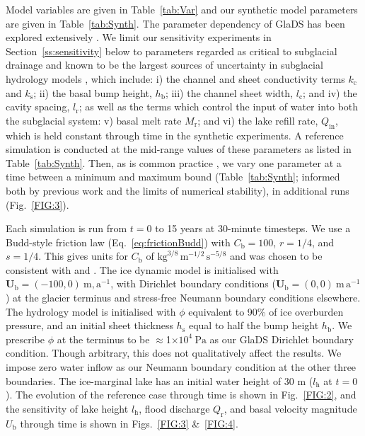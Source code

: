 \documentclass[tc, manuscript]{copernicus}
\begin{document}
Model variables are given in Table~\ref{tab:Var} and our synthetic model parameters are given in Table~\ref{tab:Synth}. The parameter dependency of GlaDS has been explored extensively \citep[e.g.,][]{dow2016modeling,dow2020totten,hill2024improved}. We limit our sensitivity experiments in Section~\ref{ss:sensitivity} below to parameters regarded as critical to subglacial drainage and known to be the largest sources of uncertainty in subglacial hydrology models \citep{werder2013modeling,hill2025computationally,hill2025emulator}, which include: i) the channel and sheet conductivity terms $k_{\mathrm{c}}$ and $k_{\mathrm{s}}$; ii) the basal bump height, $h_{\mathrm{b}}$; iii) the channel sheet width, $l_{\mathrm{c}}$; and iv) the cavity spacing, $l_{\mathrm{r}}$; as well as the terms which control the input of water into both the subglacial system: v) basal melt rate $M_{\mathrm{r}}$; and vi) the lake refill rate, $Q_{\mathrm{in}}$, which is held constant through time in the synthetic experiments. A reference simulation is conducted at the mid-range values of these parameters as listed in Table~\ref{tab:Synth}. Then, as is common practice \citep{dow2022role}, we vary one parameter at a time between a minimum and maximum bound (Table~\ref{tab:Synth}; informed both by previous work and the limits of numerical stability), in additional runs (Fig.~\ref{FIG:3}). 

Each simulation is run from $t=0$ to 15 years at 30-minute timesteps. We use a Budd-style friction law (Eq.~\ref{eq:frictionBudd}) with $C_{\mathrm{b}} = 100$, $r = 1/4$, and $s = 1/4$. This gives units for $C_{\mathrm{b}}$ of $\mathrm{kg}^{3/8}\,\mathrm{m}^{-1/2}\,\mathrm{s}^{-5/8}$ and was chosen to be consistent with \citet{bindschadler1983importance} and \citet{kingslake2013modelling}. The ice dynamic model is initialised with $\mathbf{U}_{\mathrm{b}} = (-100,0)\ \mathrm{m,a}^{-1}$, with Dirichlet boundary conditions ($\mathbf{U}_{\mathrm{b}} = (0,0)\ \mathrm{m\,a}^{-1}$) at the glacier terminus and stress-free Neumann boundary conditions elsewhere. The hydrology model is initialised with $\phi$ equivalent to 90\% of ice overburden pressure, and an initial sheet thickness $h_{\mathrm{s}}$ equal to half the bump height $h_{\mathrm{b}}$. We prescribe $\phi$ at the terminus to be $\approx$1$\times10^{4}\ \mathrm{Pa}$ as our GlaDS Dirichlet boundary condition. Though arbitrary, this does not qualitatively affect the results. We impose zero water inflow as our Neumann boundary condition at the other three boundaries. The ice-marginal lake has an initial water height of 30 m ($l_{\mathrm{h}}$ at $t=0$). The evolution of the reference case through time is shown in Fig.~\ref{FIG:2}, and the sensitivity of lake height $l_{\mathrm{h}}$, flood discharge $Q_{\mathrm{r}}$, and basal velocity magnitude $U_{\mathrm{b}}$ through time is shown in Figs.~\ref{FIG:3} \&~\ref{FIG:4}.
\end{document}
